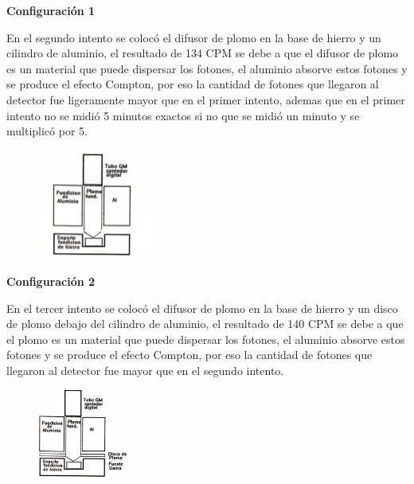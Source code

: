 \documentclass[a4paper]{article}
\begin{document}
    \begin{center}
        \textbf{Configuración 1}\\
    \end{center}


    \newpage
    \noindent
    \thispagestyle{fancy}

    \indent En el segundo intento se colocó el difusor de plomo en la base de hierro y un cilindro de aluminio, el resultado de 134 CPM se debe a que el difusor de plomo es un material que puede dispersar los fotones, el aluminio absorve estos fotones y se produce el efecto Compton, por eso la cantidad de fotones que llegaron al detector fue ligeramente mayor que en el primer intento, ademas que en el primer intento no se midió 5 minutos exactos si no que se midió un minuto y se multiplicó por 5.\\

    \begin{figure}[h!]
        \centering
        \vspace{-2mm}
        \includegraphics[width=4cm]{../imagenes/imagen2.png}
        \vspace{-5mm}
    \end{figure}

    \begin{center}
        \textbf{Configuración 2}\\
    \end{center}


    \indent En el tercer intento se colocó el difusor de plomo en la base de hierro y un disco de plomo debajo del cilindro de aluminio, el resultado de 140 CPM se debe a que el plomo es un material que puede dispersar los fotones, el aluminio absorve estos fotones y se produce el efecto Compton, por eso la cantidad de fotones que llegaron al detector fue mayor que en el segundo intento.\\

    \begin{figure}[h!]
        \centering
        \vspace{-2mm}
        \includegraphics[width=3cm]{../imagenes/imagen3a.png}
        \vspace{-5mm}
    \end{figure}
\end{document}

